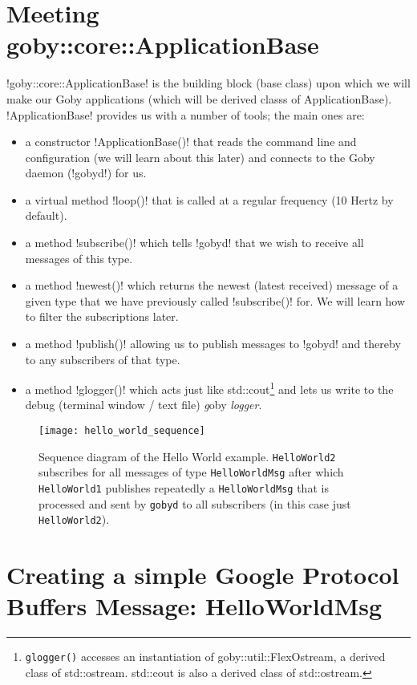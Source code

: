 \section{Meeting goby::core::ApplicationBase}

!goby::core::ApplicationBase! is the building block (\gls{base class}) upon which we will make our Goby applications (which will be \glspl{derived class} of ApplicationBase). !ApplicationBase! provides us with a number of tools; the main ones are:

\begin{itemize}
\item a constructor !ApplicationBase()! that reads the command line and configuration (we will learn about this later) and connects to the Goby \gls{daemon} (!gobyd!) for us.
\item a virtual method !loop()! that is called at a regular frequency (10 Hertz by default).
\item a method !subscribe()! which tells !gobyd! that we wish to receive all messages of this type.
\item a method !newest()! which returns the newest (latest received) message of a given type that we have previously called !subscribe()! for. We will learn how to filter the subscriptions later.
\item a method !publish()! allowing us to publish messages to !gobyd! and thereby to any subscribers of that type.
\item a method !glogger()! which acts just like std::cout\footnote{\texttt{glogger()} accesses an instantiation of goby::util::FlexOstream, a derived class of std::ostream. std::cout is also a derived class of std::ostream.} and lets us write to the debug (terminal window / text file) \textit{g}oby \textit{logger}.
\end{itemize}


\begin{figure}
\centering
\texttt{[image: hello\_world\_sequence]}
\caption{Sequence diagram of the Hello World example. \texttt{HelloWorld2} subscribes for all messages of type \texttt{HelloWorldMsg} after which \texttt{HelloWorld1} publishes repeatedly a \texttt{HelloWorldMsg} that is processed and sent by \texttt{gobyd} to all subscribers (in this case just \texttt{HelloWorld2}).}
\label{fig:hello_world_sequence}
\end{figure}


\section{Creating a simple Google Protocol Buffers Message: HelloWorldMsg}\label{sec:proto_ex}

